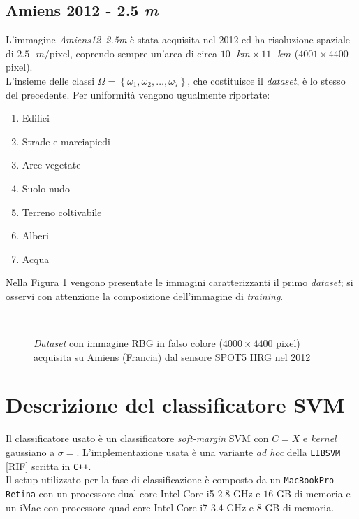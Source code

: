 \subsection{Amiens 2012 - 2.5 \textit{m}}
L'immagine \emph{Amiens12--2.5m} è stata acquisita nel 2012 ed ha  risoluzione spaziale di $2.5\text{ }m/\text{pixel}$, coprendo sempre un'area di circa $10\text{ }km\times11\text{ }km$ ($4001\times4400$ pixel).\\
L'insieme delle classi $\Omega=\left\lbrace\omega_1,\omega_2,\ldots,\omega_{7}\right\rbrace$, che costituisce il \emph{dataset}, è lo stesso del precedente. Per uniformità vengono ugualmente riportate:
\begin{enumerate}
\item Edifici
\item Strade e marciapiedi
\item Aree vegetate
\item Suolo nudo
\item Terreno coltivabile
\item Alberi
\item Acqua
\end{enumerate}
Nella Figura \ref{fig: Amiens122_5m} vengono presentate le immagini caratterizzanti il primo \emph{dataset}; si osservi con attenzione la composizione dell'immagine di \emph{training}.
\clearpage
\begin{figure}[!ht]
   \center
   \\%
     \hspace{4mm}
    \caption{\emph{Dataset} con immagine RBG in falso colore ($4000\times4400$ pixel) acquisita su Amiens (Francia) dal sensore \textsc{SPOT5 HRG} nel 2012}
    \label{fig: Amiens122_5m}
  \end{figure}
\clearpage

\section{Descrizione del classificatore SVM}
Il classificatore usato è un classificatore \emph{soft-margin} SVM con $C=X$ e \emph{kernel} gaussiano a $\sigma = $. L'implementazione usata è una variante \emph{ad hoc} della \texttt{LIBSVM} [RIF] scritta in \texttt{C++}.\\
Il setup utilizzato per la fase di classificazione è composto da un \texttt{MacBookPro Retina} con un processore dual core Intel Core i5 $2.8$ GHz e $16$ GB di memoria e un iMac con processore quad core Intel Core i7 $3.4$ GHz e $8$ GB di memoria. \\

